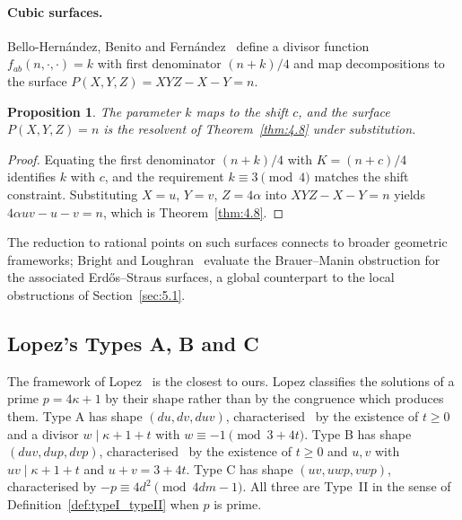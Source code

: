 \documentclass[11pt, a4paper]{article}
\theoremstyle{plain}
\newtheorem{proposition}[theorem]{Proposition}
\theoremstyle{definition}
\begin{document}
\paragraph{Cubic surfaces.}
Bello-Hern\'{a}ndez, Benito and Fern\'{a}ndez~\cite{bello2026} define a divisor function $f_{ab}(n,\cdot,\cdot)=k$ with first denominator $(n+k)/4$ and map decompositions to the surface $P(X,Y,Z)=XYZ-X-Y=n$.

\begin{proposition}\label{prop:cubic}
The parameter $k$ maps to the shift $c$, and the surface $P(X,Y,Z)=n$ is the resolvent of Theorem~\ref{thm:4.8} under substitution.
\end{proposition}
\begin{proof}
Equating the first denominator $(n+k)/4$ with $K=(n+c)/4$ identifies $k$ with $c$, and the requirement $k\equiv3\pmod4$ matches the shift constraint. Substituting $X=u$, $Y=v$, $Z=4\alpha$ into $XYZ-X-Y=n$ yields $4\alpha uv-u-v=n$, which is Theorem~\ref{thm:4.8}.
\end{proof}

The reduction to rational points on such surfaces connects to broader geometric frameworks; Bright and Loughran~\cite{bright2019} evaluate the Brauer--Manin obstruction for the associated Erd\H{o}s--Straus surfaces, a global counterpart to the local obstructions of Section~\ref{sec:5.1}.

\subsection{Lopez's Types A, B and C} \label{sec:6.4}

The framework of Lopez~\cite{lopez2022, lopez2024} is the closest to ours. Lopez classifies the solutions of a prime $p=4\kappa+1$ by their shape rather than by the congruence which produces them. Type A has shape $(du,dv,duv)$, characterised~\cite{lopez2022} by the existence of $t\ge0$ and a divisor $w\mid \kappa+1+t$ with $w\equiv-1\pmod{3+4t}$. Type B has shape $(duv,dup,dvp)$, characterised~\cite[Thm.~4 and Thm.~6]{lopez2024} by the existence of $t\ge0$ and $u,v$ with $uv\mid \kappa+1+t$ and $u+v=3+4t$. Type C has shape $(uv,uwp,vwp)$, characterised by $-p\equiv4d^{2}\pmod{4dm-1}$. All three are Type~II in the sense of Definition~\ref{def:typeI_typeII} when $p$ is prime.
\end{document}
